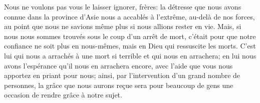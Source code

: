 Nous ne voulons pas vous le laisser ignorer, frères:
	la détresse que nous avons connue dans la province d’Asie
	nous a accablés à l’extrême, au-delà de nos forces,
	au point que nous ne savions même plus si nous allions rester en vie.
Mais, si nous nous sommes trouvés sous le coup d’un arrêt de mort,
	c’était pour que notre confiance ne soit plus en nous-mêmes,
	mais en Dieu qui ressuscite les morts.
C’est lui qui nous a arrachés à une mort si terrible et qui nous en arrachera;
	en lui nous avons l’espérance qu’il nous en arrachera encore,
	avec l’aide que vous nous apportez en priant pour nous;
	ainsi, par l’intervention d’un grand nombre de personnes,
	la grâce que nous aurons reçue
		sera pour beaucoup de gens une occasion de rendre grâce à notre sujet.
